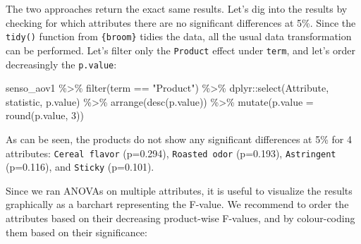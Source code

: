 \documentclass[
]{book}
\newenvironment{Shaded}{\begin{snugshade}}{\end{snugshade}}
\newcommand{\AttributeTok}[1]{\textcolor[rgb]{0.77,0.63,0.00}{#1}}
\newcommand{\DecValTok}[1]{\textcolor[rgb]{0.00,0.00,0.81}{#1}}
\newcommand{\FunctionTok}[1]{\textcolor[rgb]{0.00,0.00,0.00}{#1}}
\newcommand{\NormalTok}[1]{#1}
\newcommand{\SpecialCharTok}[1]{\textcolor[rgb]{0.00,0.00,0.00}{#1}}
\newcommand{\StringTok}[1]{\textcolor[rgb]{0.31,0.60,0.02}{#1}}
\begin{document}
The two approaches return the exact same results. Let's dig into the results by checking for which attributes there are no significant differences at 5\%. Since the \texttt{tidy()} function from \texttt{\{broom\}} tidies the data, all the usual data transformation can be performed. Let's filter only the \texttt{Product} effect under \texttt{term}, and let's order decreasingly the \texttt{p.value}:

\begin{Shaded}
\begin{Highlighting}[]
\NormalTok{senso\_aov1 }\SpecialCharTok{\%\textgreater{}\%} 
  \FunctionTok{filter}\NormalTok{(term }\SpecialCharTok{==} \StringTok{"Product"}\NormalTok{) }\SpecialCharTok{\%\textgreater{}\%} 
\NormalTok{  dplyr}\SpecialCharTok{::}\FunctionTok{select}\NormalTok{(Attribute, statistic, p.value) }\SpecialCharTok{\%\textgreater{}\%} 
  \FunctionTok{arrange}\NormalTok{(}\FunctionTok{desc}\NormalTok{(p.value)) }\SpecialCharTok{\%\textgreater{}\%} 
  \FunctionTok{mutate}\NormalTok{(}\AttributeTok{p.value =} \FunctionTok{round}\NormalTok{(p.value, }\DecValTok{3}\NormalTok{))}
\end{Highlighting}
\end{Shaded}

As can be seen, the products do not show any significant differences at 5\% for 4 attributes: \texttt{Cereal\ flavor} (p=0.294), \texttt{Roasted\ odor} (p=0.193), \texttt{Astringent} (p=0.116), and \texttt{Sticky} (p=0.101).

Since we ran ANOVAs on multiple attributes, it is useful to visualize the results graphically as a barchart representing the F-value. We recommend to order the attributes based on their decreasing product-wise F-values, and by colour-coding them based on their significance:
\end{document}
